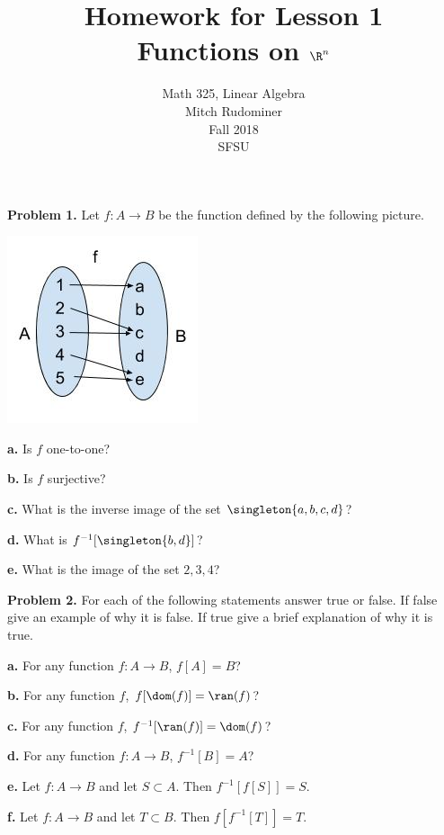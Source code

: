 \documentclass[oneside,12pt]{amsart}
\begin{document}
\title{Homework for Lesson 1 \\ Functions on $\R^n$}
\author{Math 325, Linear Algebra \\ Mitch Rudominer \\ Fall 2018 \\ SFSU }
\date{}

\maketitle


\textbf{Problem 1.} Let $f:A\to B$ be the function defined by the following
picture.

\includegraphics[scale=0.25]{hw_function1}

\textbf{a.} Is $f$ one-to-one?

\smallskip

\textbf{b.} Is $f$ surjective?

\smallskip

\textbf{c.} What is the inverse image of the set $\singleton{a,b,c,d}$?

\medskip

\textbf{d.} What is $f^{-1}[\singleton{b, d}]$?

\medskip

\textbf{e.} What is the image of the set ${2,3,4}$?

\bigskip

\textbf{Problem 2.} For each of the following statements answer true or
false. If false give an example of why it is false. If true give a brief
explanation of why it is true.

\smallskip

\textbf{a.} For any function $f:A\to B$, $f[A] = B$?

\bigskip
\bigskip

\textbf{b.} For any function $f$, $f[\dom(f)] = \ran(f)$?

\bigskip
\bigskip

\textbf{c.} For any function $f$, $f^{-1}[\ran(f)] = \dom(f)$?

\bigskip
\bigskip

\textbf{d.} For any function  $f:A\to B$, $f^{-1}[B] = A$?

\bigskip
\bigskip

\textbf{e.} Let $f:A\to B$ and let $S\subset A$. Then $f^{-1}[f[S]] = S$.

\bigskip
\bigskip

\textbf{f.} Let $f:A\to B$ and let $T\subset B$. Then $f[f^{-1}[T]] = T$.
\end{document}
